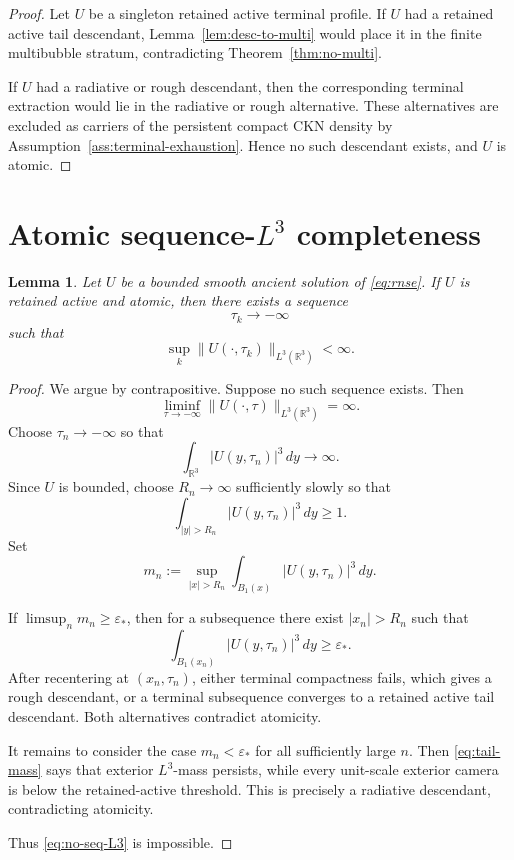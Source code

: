 \documentclass[11pt]{article}
\numberwithin{equation}{section}
\newtheorem{lemma}[theorem]{Lemma}
\newcommand{\R}{\mathbb R}
\newcommand{\eps}{\varepsilon}
\begin{document}
\begin{proof}
Let \(U\) be a singleton retained active terminal profile.  If \(U\) had a
retained active tail descendant, Lemma~\ref{lem:desc-to-multi} would place it
in the finite multibubble stratum, contradicting Theorem~\ref{thm:no-multi}.

If \(U\) had a radiative or rough descendant, then the corresponding terminal
extraction would lie in the radiative or rough alternative.  These alternatives
are excluded as carriers of the persistent compact CKN density by
Assumption~\ref{ass:terminal-exhaustion}.  Hence no such descendant exists, and
\(U\) is atomic.
\end{proof}

\section{Atomic sequence-\(L^3\) completeness}

\begin{lemma}
\label{lem:atomic-L3}
Let \(U\) be a bounded smooth ancient solution of \eqref{eq:rnse}.  If \(U\) is
retained active and atomic, then there exists a sequence
\[
  \tau_k\to-\infty
\]
such that
\[
  \sup_k\|U(\cdot,\tau_k)\|_{L^3(\R^3)}<\infty.
\]
\end{lemma}

\begin{proof}
We argue by contrapositive.  Suppose no such sequence exists.  Then
\begin{equation}
  \liminf_{\tau\to-\infty}
  \|U(\cdot,\tau)\|_{L^3(\R^3)}
  =\infty.
  \label{eq:no-seq-L3}
\end{equation}
Choose \(\tau_n\to-\infty\) so that
\[
  \int_{\R^3}|U(y,\tau_n)|^3\,dy\to\infty.
\]
Since \(U\) is bounded, choose \(R_n\to\infty\) sufficiently slowly so that
\begin{equation}
  \int_{|y|>R_n}|U(y,\tau_n)|^3\,dy\ge 1.
  \label{eq:tail-mass}
\end{equation}
Set
\[
  m_n:=
  \sup_{|x|>R_n}
  \int_{B_1(x)}|U(y,\tau_n)|^3\,dy.
\]

If \(\limsup_n m_n\ge\eps_*\), then for a subsequence there exist
\(|x_n|>R_n\) such that
\[
  \int_{B_1(x_n)}|U(y,\tau_n)|^3\,dy\ge\eps_*.
\]
After recentering at \((x_n,\tau_n)\), either terminal compactness fails,
which gives a rough descendant, or a terminal subsequence converges to a
retained active tail descendant.  Both alternatives contradict atomicity.

It remains to consider the case \(m_n<\eps_*\) for all sufficiently large
\(n\).  Then \eqref{eq:tail-mass} says that exterior \(L^3\)-mass persists,
while every unit-scale exterior camera is below the retained-active threshold.
This is precisely a radiative descendant, contradicting atomicity.

Thus \eqref{eq:no-seq-L3} is impossible.
\end{proof}
\end{document}
